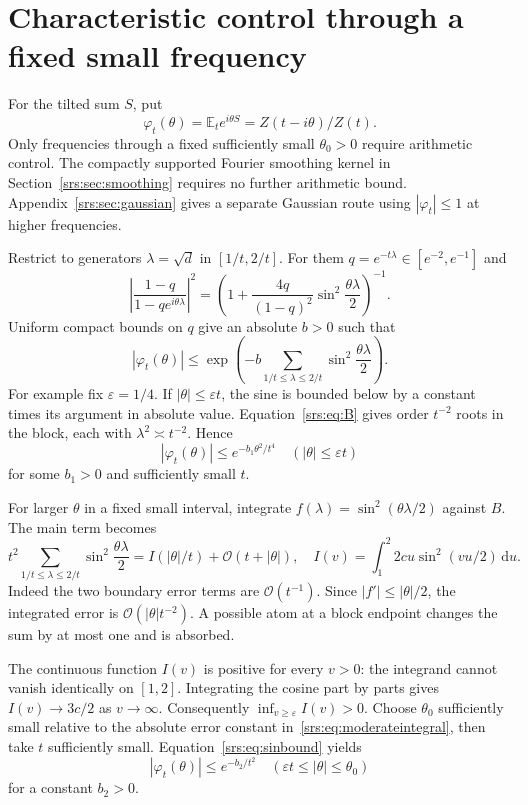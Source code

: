 \documentclass[11pt]{article}
\numberwithin{equation}{section}
\theoremstyle{remark}\newtheorem{remark}[theorem]{Remark}
\newcommand{\Oh}{\mathcal O}
\newcommand{\dd}{\,\mathrm d}
\begin{document}
\section{Characteristic control through a fixed small frequency}\label{srs:sec:characteristic}
For the tilted sum $S$, put
\[
 \varphi_t(\theta)=\mathbb E_t e^{i\theta S}=Z(t-i\theta)/Z(t).
\]
Only frequencies through a fixed sufficiently small $\theta_0>0$ require arithmetic control. The compactly supported Fourier smoothing kernel in Section~\ref{srs:sec:smoothing} requires no further arithmetic bound. Appendix~\ref{srs:sec:gaussian} gives a separate Gaussian route using $|\varphi_t|\le1$ at higher frequencies.

Restrict to generators $\lambda=\sqrt d$ in $[1/t,2/t]$. For them $q=e^{-t\lambda}\in[e^{-2},e^{-1}]$ and
\begin{equation}
 \left|\frac{1-q}{1-qe^{i\theta\lambda}}\right|^2
 =\left(1+\frac{4q}{(1-q)^2}\sin^2\frac{\theta\lambda}2\right)^{-1}.
\end{equation}
Uniform compact bounds on $q$ give an absolute $b>0$ such that
\begin{equation}
 |\varphi_t(\theta)|\le
 \exp\left(-b\sum_{1/t\le\lambda\le2/t}\sin^2\frac{\theta\lambda}2\right).
 \label{srs:eq:sinbound}
\end{equation}
For example fix $\varepsilon=1/4$. If $|\theta|\le\varepsilon t$, the sine is bounded below by a constant times its argument in absolute value. Equation~\eqref{srs:eq:B} gives order $t^{-2}$ roots in the block, each with $\lambda^2\asymp t^{-2}$. Hence
\begin{equation}
 |\varphi_t(\theta)|\le e^{-b_1\theta^2/t^4}
 \quad(|\theta|\le\varepsilon t)\label{srs:eq:smallchar}
\end{equation}
for some $b_1>0$ and sufficiently small $t$.

For larger $\theta$ in a fixed small interval, integrate $f(\lambda)=\sin^2(\theta\lambda/2)$ against $B$. The main term becomes
\begin{equation}
 t^2\sum_{1/t\le\lambda\le2/t}\sin^2\frac{\theta\lambda}2
 =I(|\theta|/t)+\Oh(t+|\theta|),\quad
 I(v)=\int_1^2 2cu\sin^2(vu/2)\dd u.
 \label{srs:eq:moderateintegral}
\end{equation}
Indeed the two boundary error terms are $\Oh(t^{-1})$. Since $|f'|\le|\theta|/2$, the integrated error is $\Oh(|\theta|t^{-2})$. A possible atom at a block endpoint changes the sum by at most one and is absorbed.

The continuous function $I(v)$ is positive for every $v>0$: the integrand cannot vanish identically on $[1,2]$. Integrating the cosine part by parts gives $I(v)\to3c/2$ as $v\to\infty$. Consequently $\inf_{v\ge\varepsilon}I(v)>0$. Choose $\theta_0$ sufficiently small relative to the absolute error constant in~\eqref{srs:eq:moderateintegral}, then take $t$ sufficiently small. Equation~\eqref{srs:eq:sinbound} yields
\begin{equation}
 |\varphi_t(\theta)|\le e^{-b_2/t^2}
 \quad(\varepsilon t\le|\theta|\le\theta_0)\label{srs:eq:moderatechar}
\end{equation}
for a constant $b_2>0$.
\end{document}
